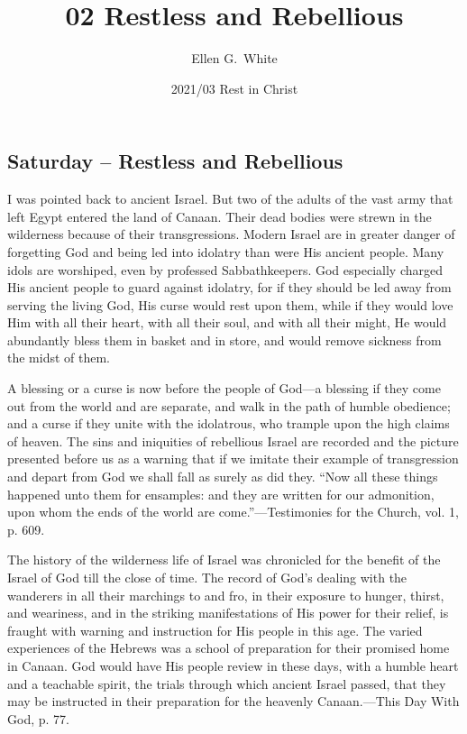 \documentclass[a4paper, 10pt, twoside, headings=small]{scrartcl}
\title{02 Restless and Rebellious}
\author{Ellen G.\ White}
\date{2021/03 Rest in Christ}
\begin{document}
\maketitle

\thispagestyle{empty}

\pagestyle{fancy}

\begin{multicols}{2}

\section*{Saturday – Restless and Rebellious}

I was pointed back to ancient Israel. But two of the adults of the vast army that left Egypt entered the land of Canaan. Their dead bodies were strewn in the wilderness because of their transgressions. Modern Israel are in greater danger of forgetting God and being led into idolatry than were His ancient people. Many idols are worshiped, even by professed Sabbathkeepers. God especially charged His ancient people to guard against idolatry, for if they should be led away from serving the living God, His curse would rest upon them, while if they would love Him with all their heart, with all their soul, and with all their might, He would abundantly bless them in basket and in store, and would remove sickness from the midst of them.

A blessing or a curse is now before the people of God—a blessing if they come out from the world and are separate, and walk in the path of humble obedience; and a curse if they unite with the idolatrous, who trample upon the high claims of heaven. The sins and iniquities of rebellious Israel are recorded and the picture presented before us as a warning that if we imitate their example of transgression and depart from God we shall fall as surely as did they. “Now all these things happened unto them for ensamples: and they are written for our admonition, upon whom the ends of the world are come.”—Testimonies for the Church, vol. 1, p. 609.

The history of the wilderness life of Israel was chronicled for the benefit of the Israel of God till the close of time. The record of God’s dealing with the wanderers in all their marchings to and fro, in their exposure to hunger, thirst, and weariness, and in the striking manifestations of His power for their relief, is fraught with warning and instruction for His people in this age. The varied experiences of the Hebrews was a school of preparation for their promised home in Canaan. God would have His people review in these days, with a humble heart and a teachable spirit, the trials through which ancient Israel passed, that they may be instructed in their preparation for the heavenly Canaan.—This Day With God, p. 77.


\end{multicols}
\end{document}
